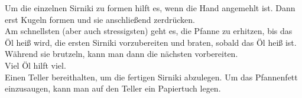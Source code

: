 \begin{recipe}
\hint
{%
Um die einzelnen Sirniki zu formen hilft es, wenn die Hand angemehlt ist. Dann erst Kugeln formen und sie anschließend zerdrücken.\\ 
Am schnellsten (aber auch stressigsten) geht es, die Pfanne zu erhitzen, bis das Öl heiß wird, die ersten Sirniki vorzubereiten und braten, sobald das Öl heiß ist. Während sie brutzeln, kann man dann die nächsten vorbereiten. \\
Viel Öl hilft viel. \\
Einen Teller bereithalten, um die fertigen Sirniki abzulegen. Um das Pfannenfett einzusaugen, kann man auf den Teller ein Papiertuch legen.        
}

    \end{recipe}
